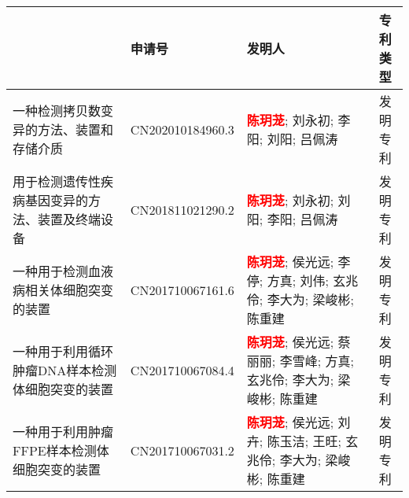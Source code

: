 



\begin{table}[h]

\centering
\tablefont
\begin{tabularx}{\textwidth}{>{\raggedright\arraybackslash}X| X| X| c}
\toprule
{\textbf{专利名称}} & {\textbf{申请号}} & {\textbf{发明人}} & {\textbf{专利类型}} \\
\midrule

一种检测拷贝数变异的方法、装置和存储介质 & CN202010184960.3 & \textbf{\textcolor{red}{陈玥茏}}; 刘永初; 李阳; 刘阳; 吕佩涛 & 发明专利 \\
\addlinespace



用于检测遗传性疾病基因变异的方法、装置及终端设备 & CN201811021290.2 & \textbf{\textcolor{red}{陈玥茏}}; 刘永初; 刘阳; 李阳; 吕佩涛 & 发明专利\\
\addlinespace



一种用于检测血液病相关体细胞突变的装置 & CN201710067161.6 & \textbf{\textcolor{red}{陈玥茏}}; 侯光远; 李停; 方真; 刘伟; 玄兆伶; 李大为; 梁峻彬; 陈重建 & 发明专利\\
\addlinespace

一种用于利用循环肿瘤DNA样本检测体细胞突变的装置 & CN201710067084.4 & \textbf{\textcolor{red}{陈玥茏}}; 侯光远; 蔡丽丽; 李雪峰; 方真; 玄兆伶; 李大为; 梁峻彬; 陈重建 &发明专利 \\
\addlinespace

一种用于利用肿瘤FFPE样本检测体细胞突变的装置 & CN201710067031.2 & \textbf{\textcolor{red}{陈玥茏}}; 侯光远; 刘卉; 陈玉洁; 王旺; 玄兆伶; 李大为; 梁峻彬; 陈重建 &发明专利 \\
\bottomrule
\end{tabularx}
\end{table}

